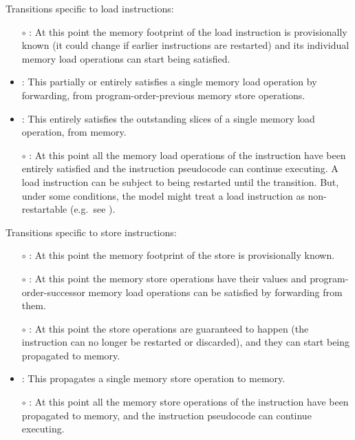 \noindent Transitions specific to load instructions:
\begin{itemize}
\item[$\circ$] : At this point the memory
  footprint of the load instruction is provisionally known (it could change if
  earlier instructions are restarted) and its individual memory load operations can start being satisfied.
\item {}: This partially or entirely
  satisfies a single memory load operation by forwarding, from
  program-order-previous memory store operations.
\item {}: This entirely satisfies the outstanding slices of a single memory load operation, from memory.
\item[$\circ$] : At this point all the memory load operations of the instruction have been entirely satisfied and the instruction pseudocode can continue executing.
A load instruction can be subject to being restarted until the  transition.
But, under some conditions, the model might treat a load instruction as non-restartable (e.g.~see ).
\end{itemize}

\noindent Transitions specific to store instructions:
\begin{itemize}
\item[$\circ$] : At this point the memory footprint of the store is provisionally known.
\item[$\circ$] : At this point the memory store operations have their values and program-order-successor memory load operations can be satisfied by forwarding from them.
\item[$\circ$] : At this point the store operations are guaranteed to happen (the instruction can no longer be restarted or discarded), and they can start being propagated to memory.
\item {}: This propagates a single memory store operation to memory.
\item[$\circ$] : At this point all the memory store operations of the instruction have been propagated to memory, and the instruction pseudocode can continue executing.
\end{itemize}

